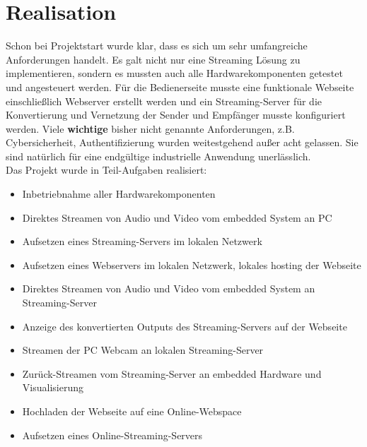 \section{Realisation}
Schon bei Projektstart wurde klar, dass es sich um sehr umfangreiche Anforderungen handelt. Es galt nicht nur eine Streaming Lösung zu implementieren, sondern es mussten auch alle Hardwarekomponenten getestet und angesteuert werden. Für die Bedienerseite musste eine funktionale Webseite einschließlich Webserver erstellt werden und ein Streaming-Server für die Konvertierung und Vernetzung der Sender und Empfänger musste konfiguriert werden. Viele \textbf{wichtige} bisher nicht genannte Anforderungen, z.B. Cybersicherheit, Authentifizierung wurden weitestgehend außer acht gelassen. Sie sind natürlich für eine endgültige industrielle Anwendung unerlässlich.\\

Das Projekt wurde in Teil-Aufgaben realisiert:
\begin{itemize}
\item Inbetriebnahme aller Hardwarekomponenten

\item Direktes Streamen von Audio und Video vom embedded System an PC
\item Aufsetzen eines Streaming-Servers im lokalen Netzwerk
\item Aufsetzen eines Webservers im lokalen Netzwerk, lokales hosting der Webseite
\item Direktes Streamen von Audio und Video vom embedded System an Streaming-Server
\item Anzeige des konvertierten Outputs des Streaming-Servers auf der Webseite
\item Streamen der PC Webcam an lokalen Streaming-Server
\item Zurück-Streamen vom Streaming-Server an embedded Hardware und Visualisierung
\item Hochladen der Webseite auf eine Online-Webspace
\item Aufsetzen eines Online-Streaming-Servers
\end{itemize}

